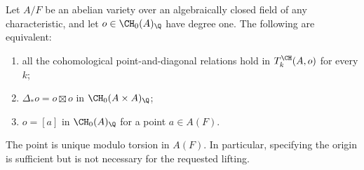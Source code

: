 \begin{theorem}
\label{c:abelian-point-classification}
Let $A/F$ be an abelian variety over an algebraically closed field of any characteristic, and let $o\in\CH_0(A)_\Q$ have degree one. The following are equivalent:
\begin{enumerate}[label=(\roman*)]
\item all the cohomological point-and-diagonal relations hold in $T_k^{\CH}(A,o)$ for every $k$;
\item $\Delta_*o=o\boxtimes o$ in $\CH_0(A\times A)_\Q$;
\item $o=[a]$ in $\CH_0(A)_\Q$ for a point $a\in A(F)$.
\end{enumerate}
The point is unique modulo torsion in $A(F)$. In particular, specifying the origin is sufficient but is not necessary for the requested lifting.
\end{theorem}


